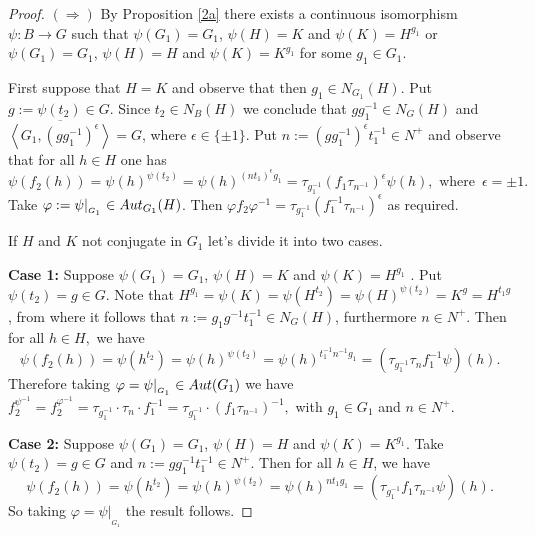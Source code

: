 \documentclass[10pt,a4paper]{amsart}
\def\aut {{\rm Aut}}
\begin{document}
\begin{proof}

$(\Longrightarrow)$ By Proposition \ref{2a} there exists a continuous  isomorphism \break 
$\psi:B\longrightarrow G$ such that $\psi(G_1) = G_1$, $\psi(H)=K$ and $\psi(K)=H^{g_1}$ or  $\psi(G_1) = G_1$, $\psi(H)=H$ and $\psi(K)=K^{g_1}$ for some $g_1\in G_1$.  


First suppose that $H=K$ and observe that then $g_1\in N_{G_1}(H)$. Put $g:=\psi(t_2) \in G$. Since $t_2 \in N_{B}(H)$ we conclude that $gg_1^{-1} \in N_{G}(H)$ and $ 
 \overline{\left\langle  G_1, (gg_1^{-1})^{\epsilon} \right\rangle}=G$, where  $\epsilon \in \{\pm 1\}.$  %
Put $n:= (gg_1^{-1})^{\epsilon}t_1^{-1} \in N^{+}$ and observe that for all $h \in H$ one has $$\psi(f_2(h)) = \psi(h)^{\psi(t_2)} = \psi(h)^{(nt_1)^{\epsilon}g_1} =\tau_{g_1^{-1}}(f_1\tau_{n^{-1}})^{\epsilon} \psi(h), \mbox{ where } \, \epsilon = \pm 1.$$ 
Take $\varphi:=\psi|_{_{G_1}} \in \aut_{G_1}(H)$. Then $\varphi f_2\varphi^{-1}=  \tau_{g_1^{-1}}(f_1^{-1}\tau_{n^{-1}})^{\epsilon}$ as required. 

\bigskip
If $H$ and $K$ not conjugate in $G_1$ let's divide it into two cases. 

\textbf{Case 1:} Suppose  $\psi(G_1) = G_1$, $\psi(H)=K$ and $\psi(K)=H^{g_1}$ . 
Put $\psi(t_2) = g \in G$. Note that $ H^{g_1}=\psi(K) =\psi(H^{t_2})=\psi(H)^{\psi(t_2)}=K^g=H^{t_1g}$, from where it follows that $n:=g_1 g^{-1} t_{1}^{-1} \in N_G(H)$, furthermore $n\in N^{+}$. %
Then for all $h \in H,$ we have$$\psi(f_2(h))=\psi(h^{t_2})=\psi(h)^{\psi(t_2)}=\psi(h)^{t_{1}^{- 1}n^{-1}g_1}=(\tau_{g_1^{-1}}\tau_{n} f_1^{- 1}  \psi)(h).$$ Therefore taking $\varphi = \psi|_{_{G_1}} \in \aut(G_1)$ we have  $f_2^{\psi^{-1}} = f_2^{\varphi^{-1}} = \tau_{g_1^{-1}} \cdot \tau_{n} \cdot f_1^{-1}= \tau_{g_1^{-1}} \cdot   (f_1\tau_{n^{-1}})^{-1},$ with $g_1 \in G_1$ and $n\in N^{+}$. 

\textbf{Case 2:} Suppose $\psi(G_1) = G_1$, $\psi(H)=H$ and $\psi(K)=K^{g_1}$. %
Take $\psi(t_2)=g\in G$ and $n:=gg_1^{-1}t_1^{-1} \in N^{+}$. 
Then for all $h\in H$, we have $$\psi(f_2(h))=\psi(h^{t_2})=\psi(h)^{\psi(t_2)}=\psi(h)^{ n t_1g_1}=(\tau_{g_1^{-1}} f_1 \tau_{n^{-1}} \psi)(h).$$ 
So  taking $\varphi=\psi|_{_{G_1}}$ the result follows. 


\end{proof}
\end{document}

